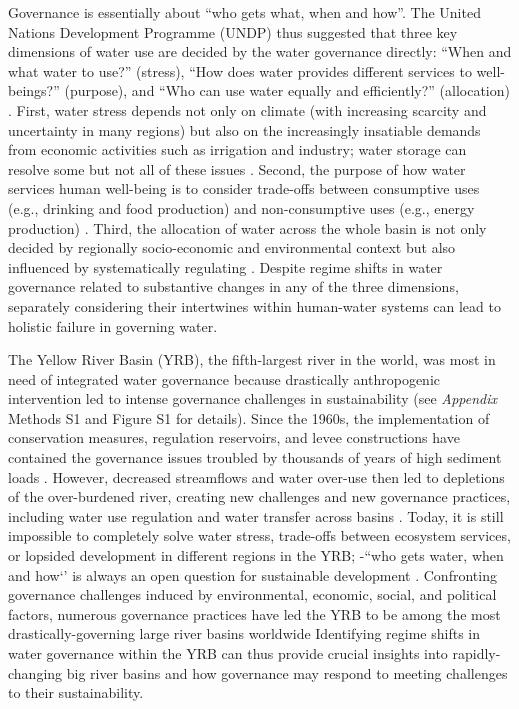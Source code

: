 Governance is essentially about ``who gets what, when and how''. The United Nations Development Programme (UNDP) thus suggested that three key dimensions of water use are decided by the water governance directly: ``When and what water to use?'' (stress), ``How does water provides different services to well-beings?'' (purpose), and ``Who can use water equally and efficiently?'' (allocation)
\cite{undpwatergovernancefacilityWaterGovernanceIssue, mariajacobsonUserguideassessing2013, kjellenWatergovernanceperspective2015}. %
First, water stress depends not only on climate (with increasing scarcity and uncertainty in many regions) but also on the increasingly insatiable demands from economic activities such as irrigation and industry; water storage can resolve some but not all of these issues
\cite{greveGlobalassessmentwater2018,wadaHumanwaterinterface2017,qinFlexibilityintensityglobal2019}.
Second, the purpose of how water services human well-being is to consider trade-offs between consumptive uses (e.g., drinking and food production) and non-consumptive uses (e.g., energy production)
\cite{liuWaterscarcityassessments2017,florkeWatercompetitioncities2018,kleemannQuantifyinginterregionalflows2020}.
Third, the allocation of water across the whole basin is not only decided by regionally socio-economic and environmental context but also influenced by systematically regulating
\cite{roobavannanRoleSectoralTransformation2017,speedBasinwaterallocation2013}.
Despite regime shifts in water governance related to substantive changes in any of the three dimensions, separately considering their intertwines within human-water systems can lead to holistic failure in governing water.

The Yellow River Basin (YRB), the fifth-largest river in the world, was most in need of integrated water governance because drastically anthropogenic intervention led to intense governance challenges in sustainability (see \textit{Appendix} Methods S1 and Figure S1 for details).
Since the 1960s, the implementation of conservation measures, regulation reservoirs, and levee constructions have contained the governance issues troubled by thousands of years of high sediment loads
\cite{wangReducedsedimenttransport2016,wuEvolutioneffectssocialecological2020}.
However, decreased streamflows and water over-use then led to depletions of the over-burdened river, creating new challenges and new governance practices, including water use regulation and water transfer across basins
\cite{xiaDevelopmentWaterAllocation2012}.
Today, it is still impossible to completely solve water stress, trade-offs between ecosystem services, or lopsided development in different regions in the YRB; -``who gets water, when and how‘’ is always an open question for sustainable development
\cite{wangYellowRiverwater2019,wohlfartSocialecologicalchallengesYellow2016}.
Confronting governance challenges induced by environmental, economic, social, and political factors, numerous governance practices have led the YRB to be among the most drastically-governing large river basins worldwide
Identifying regime shifts in water governance within the YRB can thus provide crucial insights into rapidly-changing big river basins and how governance may respond to meeting challenges to their sustainability.


